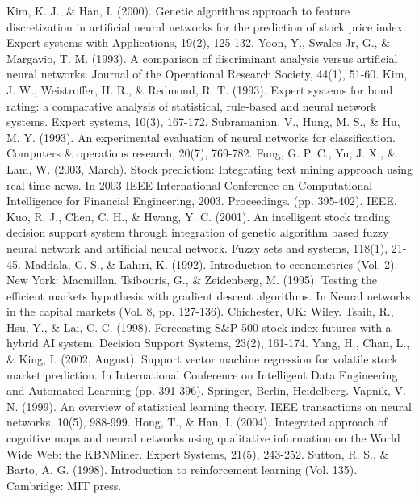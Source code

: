 \documentclass{article}
\begin{document}
\begin{thebibliography}{9}
Kim, K. J., \& Han, I. (2000). Genetic algorithms approach to feature discretization in artificial neural networks for the prediction of stock price index. Expert systems with Applications, 19(2), 125-132.
Yoon, Y., Swales Jr, G., \& Margavio, T. M. (1993). A comparison of discriminant analysis versus artificial neural networks. Journal of the Operational Research Society, 44(1), 51-60.
Kim, J. W., Weistroffer, H. R., \& Redmond, R. T. (1993). Expert systems for bond rating: a comparative analysis of statistical, rule‐based and neural network systems. Expert systems, 10(3), 167-172.
Subramanian, V., Hung, M. S., \& Hu, M. Y. (1993). An experimental evaluation of neural networks for classification. Computers \& operations research, 20(7), 769-782.
Fung, G. P. C., Yu, J. X., \& Lam, W. (2003, March). Stock prediction: Integrating text mining approach using real-time news. In 2003 IEEE International Conference on Computational Intelligence for Financial Engineering, 2003. Proceedings. (pp. 395-402). IEEE.
Kuo, R. J., Chen, C. H., \& Hwang, Y. C. (2001). An intelligent stock trading decision support system through integration of genetic algorithm based fuzzy neural network and artificial neural network. Fuzzy sets and systems, 118(1), 21-45.
Maddala, G. S., \& Lahiri, K. (1992). Introduction to econometrics (Vol. 2). New York: Macmillan.
Tsibouris, G., \& Zeidenberg, M. (1995). Testing the efficient markets hypothesis with gradient descent algorithms. In Neural networks in the capital markets (Vol. 8, pp. 127-136). Chichester, UK: Wiley.
Tsaih, R., Hsu, Y., \& Lai, C. C. (1998). Forecasting S\&P 500 stock index futures with a hybrid AI system. Decision Support Systems, 23(2), 161-174.
Yang, H., Chan, L., \& King, I. (2002, August). Support vector machine regression for volatile stock market prediction. In International Conference on Intelligent Data Engineering and Automated Learning (pp. 391-396). Springer, Berlin, Heidelberg.
Vapnik, V. N. (1999). An overview of statistical learning theory. IEEE transactions on neural networks, 10(5), 988-999.
Hong, T., \& Han, I. (2004). Integrated approach of cognitive maps and neural networks using qualitative information on the World Wide Web: the KBNMiner. Expert Systems, 21(5), 243-252.
Sutton, R. S., \& Barto, A. G. (1998). Introduction to reinforcement learning (Vol. 135). Cambridge: MIT press.
\end{thebibliography}
\end{document}
